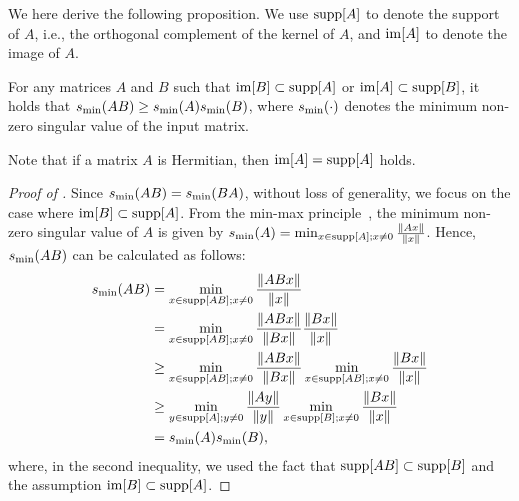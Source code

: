We here derive the following proposition. We use $\mathrm{supp}[A]$ to denote the support of $A$, i.e., the orthogonal complement of the kernel of $A$, and $\mathrm{im}[A]$ to denote the image of $A$.

\begin{proposition}
\label{prop:min singular inequality}
For any matrices $A$ and $B$ such that $\mathrm{im}[B] \subset \mathrm{supp}[A]$ or $\mathrm{im}[A] \subset \mathrm{supp}[B]$, it holds that $s_{\rm min}(AB) \geq s_{\rm min}(A) s_{\rm min}(B)$, where $s_{\rm min}(\cdot)$ denotes the minimum non-zero singular value of the input matrix.
\end{proposition}

Note that if a matrix $A$ is Hermitian, then $\mathrm{im}[A] = \mathrm{supp}[A]$ holds.




\begin{proof}[Proof of ]


Since $s_{\rm min}(AB) = s_{\rm min}(BA)$, without loss of generality, we focus on the case where $\mathrm{im}[B] \subset \mathrm{supp}[A]$.
From the min-max principle~\cite{Gohberg2003basicclass, Simon2005traceideals, bhatia2013matrix}, the minimum non-zero singular value of $A$ is given by $s_{\rm min}(A) = \min_{x \in \mathrm{supp}[A]; x \neq 0}\frac{\|Ax\|}{\|x\|}$. Hence, $s_{\rm min}(AB)$ can be calculated as follows:
\begin{align}
    s_{\rm min}(AB) 
    &= \min_{x \in \mathrm{supp}[AB]; x \neq 0}\frac{\|ABx\|}{\|x\|} \\
    &= \min_{x \in \mathrm{supp}[AB]; x \neq 0}\frac{\|ABx\|}{\|Bx\|}\frac{\|Bx\|}{\|x\|} \\
    &\geq \min_{x \in \mathrm{supp}[AB]; x \neq 0}\frac{\|ABx\|}{\|Bx\|}\min_{x \in \mathrm{supp}[AB]; x \neq 0}\frac{\|Bx\|}{\|x\|} \\
    &\geq \min_{y \in \mathrm{supp}[A]; y \neq 0}\frac{\|Ay\|}{\|y\|}\min_{x \in \mathrm{supp}[B]; x \neq 0}\frac{\|Bx\|}{\|x\|} \\
    &= s_{\rm min}(A) s_{\rm min}(B),
\end{align}
where, in the second inequality, we used the fact that $\mathrm{supp}[AB] \subset \mathrm{supp}[B]$ and the assumption $\mathrm{im}[B] \subset \mathrm{supp}[A]$.  


\end{proof}







